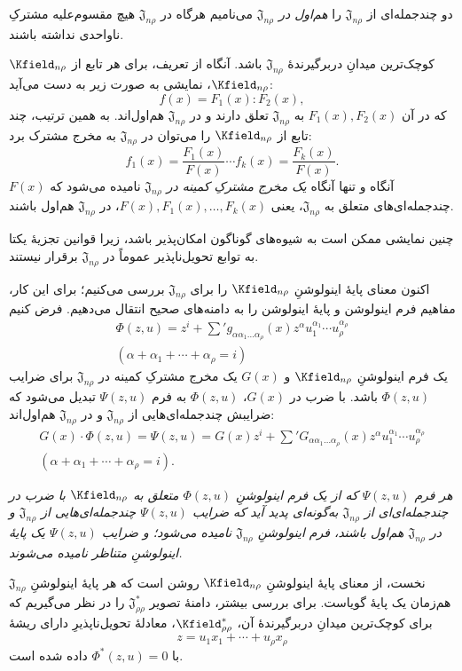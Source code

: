 \documentclass[11pt]{article}
\providecommand{\Jdom}{\mathfrak{J}}
\begin{document}
دو چندجمله‌ای از $\Jdom_{n\rho}$ را \emph{هم‌اول در $\Jdom_{n\rho}$} می‌نامیم هرگاه در $\Jdom_{n\rho}$ هیچ مقسوم‌علیه مشترکِ ناواحدی نداشته باشند.

$\Kfield_{n\rho}$ کوچک‌ترین میدانِ دربرگیرندهٔ $\Jdom_{n\rho}$ باشد. آنگاه از تعریف، برای هر تابع از $\Kfield_{n\rho}$، نمایشی به صورت زیر به دست می‌آید:
\[
f(x)=F_1(x):F_2(x),
\]
که در آن $F_1(x),F_2(x)$ به $\Jdom_{n\rho}$ تعلق دارند و در $\Jdom_{n\rho}$ هم‌اول‌اند. به همین ترتیب، چند تابع از $\Kfield_{n\rho}$ را می‌توان در $\Jdom_{n\rho}$ به مخرج مشترک برد:
\[
f_1(x)=\frac{F_1(x)}{F(x)}\cdots f_k(x)=\frac{F_k(x)}{F(x)}.
\]
$F(x)$ آنگاه و تنها آنگاه \emph{یک مخرج مشترکِ کمینه در $\Jdom_{n\rho}$} نامیده می‌شود که چندجمله‌ای‌های متعلق به $\Jdom_{n\rho}$، یعنی $F(x),F_1(x),\ldots,F_k(x)$، در $\Jdom_{n\rho}$ هم‌اول باشند.

چنین نمایشی ممکن است به شیوه‌های گوناگون امکان‌پذیر باشد، زیرا قوانین تجزیهٔ یکتا به توابع تحویل‌ناپذیر عموماً در $\Jdom_{n\rho}$ برقرار نیستند.

اکنون معنای پایهٔ اینولوشنِ $\Kfield_{n\rho}$ را برای $\Jdom_{n\rho}$ بررسی می‌کنیم؛ برای این کار، مفاهیم فرم اینولوشن و پایهٔ اینولوشن را به دامنه‌های صحیح انتقال می‌دهیم. فرض کنیم
\[
\begin{gathered}
\Phi(z,u)=z^i+\sum{}' g_{\alpha\alpha_1\ldots\alpha_\rho}(x)z^\alpha u_1^{\alpha_1}\cdots u_\rho^{\alpha_\rho}\\
(\alpha+\alpha_1+\cdots+\alpha_\rho=i)
\end{gathered}
\]
یک فرم اینولوشنِ $\Kfield_{n\rho}$ و $G(x)$ یک مخرج مشترکِ کمینه در $\Jdom_{n\rho}$ برای ضرایب $\Phi(z,u)$ باشد. با ضرب در $G(x)$، $\Phi(z,u)$ به فرم $\Psi(z,u)$ تبدیل می‌شود که ضرایبش چندجمله‌ای‌هایی از $\Jdom_{n\rho}$ و در $\Jdom_{n\rho}$ هم‌اول‌اند:
\[
\begin{gathered}
G(x)\cdot\Phi(z,u)=\Psi(z,u)=G(x)z^i+\sum{}'G_{\alpha\alpha_1\ldots\alpha_\rho}(x)z^\alpha u_1^{\alpha_1}\cdots u_\rho^{\alpha_\rho}\\
(\alpha+\alpha_1+\cdots+\alpha_\rho=i).
\end{gathered}
\]

\emph{هر فرم $\Psi(z,u)$ که از یک فرم اینولوشنِ $\Phi(z,u)$ متعلق به $\Kfield_{n\rho}$ با ضرب در چندجمله‌ای‌ای از $\Jdom_{n\rho}$ به‌گونه‌ای پدید آید که ضرایب $\Psi(z,u)$ چندجمله‌ای‌هایی از $\Jdom_{n\rho}$ و در $\Jdom_{n\rho}$ هم‌اول باشند، فرم اینولوشنِ $\Jdom_{n\rho}$ نامیده می‌شود؛ و ضرایب $\Psi(z,u)$ یک پایهٔ اینولوشنِ متناظر نامیده می‌شوند.}

نخست، از معنای پایهٔ اینولوشنِ $\Kfield_{n\rho}$ روشن است که هر پایهٔ اینولوشنِ $\Jdom_{n\rho}$ هم‌زمان یک پایهٔ گویاست. برای بررسی بیشتر، دامنهٔ تصویر $\Jdom^*_{\rho\rho}$ را در نظر می‌گیریم که برای کوچک‌ترین میدانِ دربرگیرندهٔ آن، $\Kfield^*_{\rho\rho}$، معادلهٔ تحویل‌ناپذیرِ دارای ریشهٔ
\[
z=u_1x_1+\cdots+u_\rho x_\rho
\]
با $\Phi^*(z,u)=0$ داده شده است.
\end{document}
